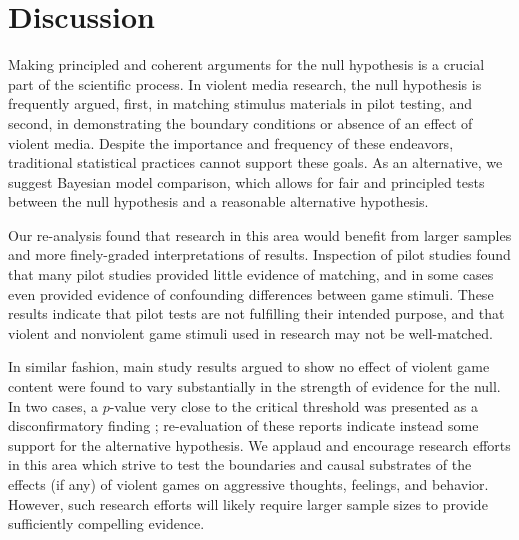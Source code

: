 \documentclass[man]{apa6}
\begin{document}
\section{Discussion} 
Making principled and coherent arguments for the null hypothesis is a crucial part of the scientific process. In violent media research, the null hypothesis is frequently argued, first, in matching stimulus materials in pilot testing, and second, in demonstrating the boundary conditions or absence of an effect of violent media. Despite the importance and frequency of these endeavors, traditional statistical practices cannot support these goals. As an alternative, we suggest Bayesian model comparison, which allows for fair and principled tests between the null hypothesis and a reasonable alternative hypothesis.

Our re-analysis found that research in this area would benefit from larger samples and more finely-graded interpretations of results. Inspection of pilot studies found that many pilot studies provided little evidence of matching, and in some cases even provided evidence of confounding differences between game stimuli. These results indicate that pilot tests are not fulfilling their intended purpose, and that violent and nonviolent game stimuli used in research may not be well-matched.

In similar fashion, main study results argued to show no effect of violent game content were found to vary substantially in the strength of evidence for the null. In two cases, a $p$-value very close to the critical threshold was presented as a disconfirmatory finding \citep{Elson:etal:2013,Valadez:Ferguson:2012}; re-evaluation of these reports indicate instead some support for the alternative hypothesis. We applaud and encourage research efforts in this area which strive to test the boundaries and causal substrates of the effects (if any) of violent games on aggressive thoughts, feelings, and behavior. However, such research efforts will likely require larger sample sizes to provide sufficiently compelling evidence. 
\end{document}
